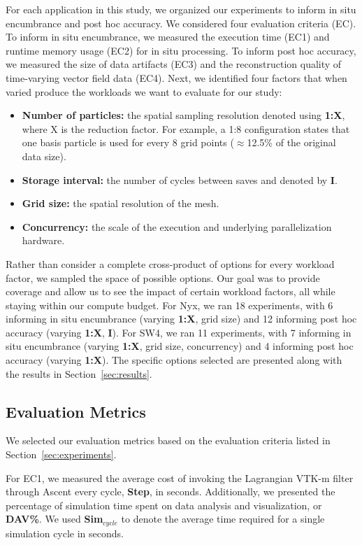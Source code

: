 \documentclass[runningheads]{llncs}
\newenvironment{tightItemize}{
\begin{itemize}
        \setlength{\itemsep}{1pt}
        \setlength{\parskip}{0pt}
        \setlength{\parsep}{0pt}
}{\end{itemize}
}
\begin{document}
For each application in this study, we organized our experiments to inform in situ encumbrance and post hoc accuracy.
%
We considered four evaluation criteria (EC).
%
To inform in situ encumbrance,  we measured the execution time (EC1) and runtime memory usage (EC2) for in situ processing.
%
To inform post hoc accuracy, we measured the size of data artifacts (EC3) and the reconstruction quality of time-varying vector field data (EC4).
%
Next, we identified four factors that when varied produce the workloads we want to evaluate for our study:
\begin{tightItemize}
\item\textbf{Number of particles:} the spatial sampling resolution denoted using \textbf{1:X}, where X is the reduction factor. For example, a 1:8 configuration states that one basis particle is used for every 8 grid points ($\approx$12.5\% of the original data size).
\item\textbf{Storage interval:} the number of cycles between saves and denoted by \textbf{I}.
\item\textbf{Grid size:} the spatial resolution of the mesh.
\item\textbf{Concurrency:} the scale of the execution and underlying parallelization hardware.
\end{tightItemize}
%
Rather than consider a complete cross-product of options for every workload factor, we sampled the space of possible options.
%
Our goal was to provide coverage and allow us to see the impact of certain workload factors, all while staying within our compute budget.
%
For Nyx, we ran 18 experiments, with 6 informing in situ encumbrance (varying \textbf{1:X}, grid size) and 12 informing post hoc accuracy (varying \textbf{1:X}, \textbf{I}).
%
For SW4, we ran 11 experiments, with 7 informing in situ encumbrance (varying \textbf{1:X}, grid size, concurrency) and 4 informing post hoc accuracy (varying \textbf{1:X}).
%
The specific options selected are presented along with the results in Section~\ref{sec:results}.

\vspace{-3mm}
\subsection{Evaluation Metrics}
\label{sec:metrics}
We selected our evaluation metrics based on the evaluation criteria listed in Section~\ref{sec:experiments}.
%

For EC1, we measured the average cost of invoking the Lagrangian VTK-m filter through Ascent every cycle, \textbf{Step}, in seconds. Additionally, we presented the percentage of simulation time spent on data analysis and visualization, or \textbf{DAV\%}.
%
We used \textbf{Sim$_{cycle}$} to denote the average time required for a single simulation cycle in seconds.
\end{document}
